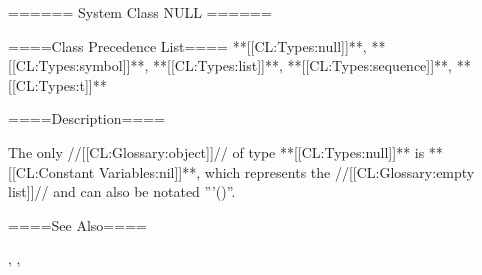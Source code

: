 ====== System Class NULL ======

====Class Precedence List==== **[[CL:Types:null]]**, **[[CL:Types:symbol]]**, **[[CL:Types:list]]**, **[[CL:Types:sequence]]**, **[[CL:Types:t]]**

====Description====

The only //[[CL:Glossary:object]]// of type **[[CL:Types:null]]** is **[[CL:Constant Variables:nil]]**, which represents the //[[CL:Glossary:empty list]]// and can also be notated '''()''.

====See Also====

{\secref\SymbolTokens}, {\secref\LeftParen}, {\secref\PrintingSymbols}

